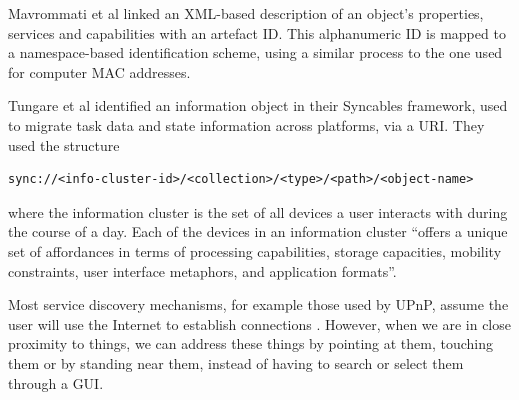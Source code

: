 % 


Mavrommati et al \cite{Mavrommati2004} linked an XML-based description of an object's properties, services and capabilities with an artefact ID. This alphanumeric ID is mapped to a namespace-based identification scheme, using a similar process to the one used for computer MAC addresses.

Tungare et al \cite{Tungare2007} identified an information object in their Syncables framework, used to migrate task data and state information across platforms, via a \ac{URI}. They used the structure 

\begin{verbatim}
sync://<info-cluster-id>/<collection>/<type>/<path>/<object-name>	
\end{verbatim}

where the information cluster is the set of all devices a user interacts with during the course of a day. Each of the devices in an information cluster ``offers a unique set of affordances in terms of processing capabilities, storage capacities, mobility constraints, user interface metaphors, and application formats''.

Most service discovery mechanisms, for example those used by \ac{UPnP}, assume the user will use the Internet to establish connections \cite{Jeronimo2009}. However, when we are in close proximity to things, we can address these things by pointing at them, touching them or by standing near them, instead of having to search or select them through a \ac{GUI}.


